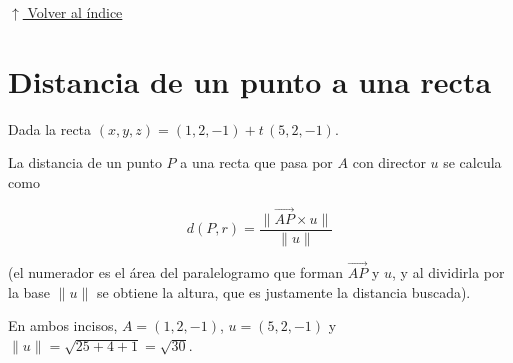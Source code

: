 \documentclass[12pt]{article}
\newcommand{\volverindice}{%
    \vspace{1em}%
    \begin{flushright}%
        \hyperlink{indice}{\small $\uparrow$ Volver al índice}%
    \end{flushright}%
}
\begin{document}
\volverindice
\newpage


\section{Distancia de un punto a una recta}

Dada la recta $(x,y,z)=(1,2,-1)+t\,(5,2,-1)$.

La distancia de un punto $P$ a una recta que pasa por $A$ con director $u$
se calcula como

\[
d(P,r)=\frac{\big\|\overrightarrow{AP}\times u\big\|}{\|u\|}
\]

(el numerador es el área del paralelogramo que forman
$\overrightarrow{AP}$ y $u$, y al dividirla por la base $\|u\|$ se obtiene
la altura, que es justamente la distancia buscada).

En ambos incisos, $A=(1,2,-1)$, $u=(5,2,-1)$ y
$\|u\|=\sqrt{25+4+1}=\sqrt{30}$.
\end{document}
